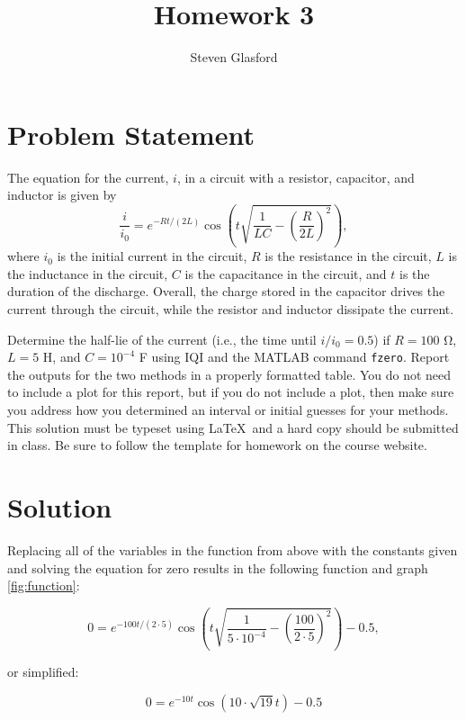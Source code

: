 \documentclass[11pt]{article}
\title{Homework 3}
\author{Steven Glasford}
\date{\parbox{\linewidth}{\centering%
    \today\endgraf\medskip
    Numerical Analysis\endgraf\medskip
    MATH-373}}
\begin{document}
\maketitle
\pagebreak

\section{Problem Statement}
The equation for the current, $i$, in a circuit with a resistor, capacitor, and inductor is given by 
$$\frac{i}{i_0} = e^{-Rt/(2L)} \cos{\left( t \sqrt{\frac{1}{LC} - \left(\frac{R}{2L} \right)^2}\right)},$$ where $i_0$ 
is the initial current in the circuit, $R$ is the resistance in the circuit, $L$ is the inductance in the circuit, $C$ is the capacitance in the circuit, and $t$ is the duration of the discharge.  Overall, the charge stored in the capacitor drives the current through the circuit, while the resistor and inductor dissipate the current.

Determine the half-lie of the current (i.e., the time until $i/i_0 = 0.5$) if $R = 100$ \si{\ohm}, $L = 5$ \si{\henry}, and $C = 10^{-4}$ \si{\farad} using IQI and the MATLAB command \texttt{fzero}.  Report the outputs for the two methods in a properly formatted table.  You do not need to include a plot for this report, but if you do not include a plot, then make sure you address how you determined an interval or initial guesses for your methods.  This solution must be typeset using \LaTeX\ and a hard copy should be submitted in class.  Be sure to follow the template for homework on the course website.

\section{Solution}

Replacing all of the variables in the function from above with the constants given and solving the equation for zero results in the following function and graph \ref{fig:function}:


$$0 = e^{-100t/(2\cdot 5)} \cos{\left( t \sqrt{\frac{1}{5\cdot 10^{-4}} - \left(\frac{100}{2\cdot 5} \right)^2}\right)} - 0.5,$$

or simplified:

$$0 = e^{-10t} \cos{\left(  10\cdot\sqrt{19}t\right)} - 0.5$$

\bigskip
\end{document}
